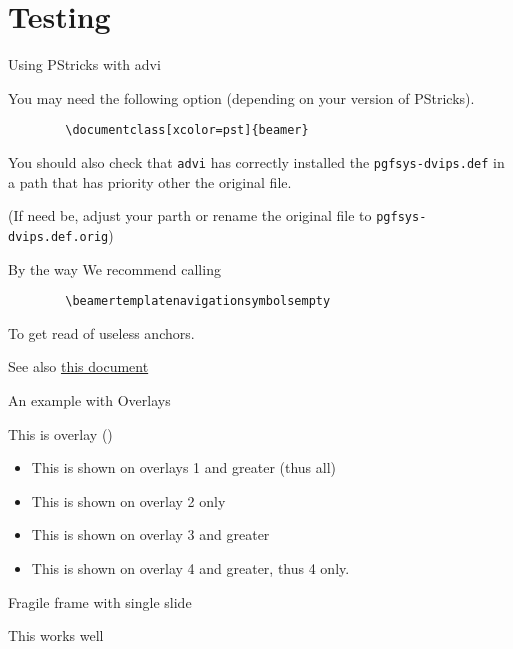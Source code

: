 \documentclass[xcolor=pst,compress]{beamer}
\begin{document}
\section{Testing}
\begin{frame}[fragile=singleslide]{Using PStricks with advi}

You may need the following option (depending on your version of PStricks). 
\begin{verbatim}
        \documentclass[xcolor=pst]{beamer}
\end{verbatim}

You should also check that 
\texttt{advi} has correctly installed the
\texttt{pgfsys-dvips.def} in a path that has priority other the original 
file. 

(If need be, adjust your parth or rename the original file to
\texttt{pgfsys-dvips.def.orig})



\end{frame}
\begin{frame}[fragile=singleslide]{By the way}
We recommend calling
\begin{verbatim}
        \beamertemplatenavigationsymbolsempty
\end{verbatim}
To get read of useless anchors.

See also 
\href{http://www.giref.ulaval.ca/~ctibirna/work/readings/beamer_pstricks.pdf}
{this document} 

\end{frame}
\begin{frame}{An example with Overlays}

This is overlay ()

\begin{itemize}
\item<1-> This is shown on overlays 1 and greater (thus all)
\item<2> This is shown on overlay 2 only
\item<3-> This is shown on overlay 3 and greater
\item<4-> This is shown on overlay 4 and greater, thus  4 only.
\end{itemize}
\end{frame}
\begin{frame}[fragile=singleslide]{Fragile frame with single slide}

This works well
\end{frame}
\end{document}

